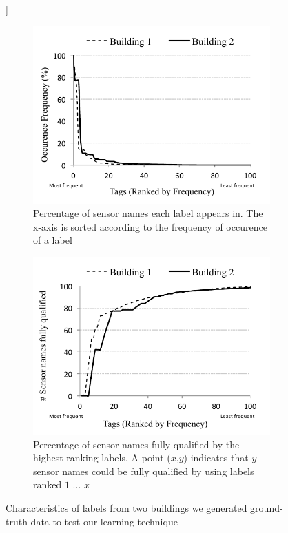 \begin{figure}[h!]]
\centering
	\begin{subfigure}{0.48\textwidth}
                \centering
		\includegraphics[width=\textwidth]{./figs/pointOccuranceFreq.pdf}
                \caption{Percentage of sensor names each label appears in. The x-axis is sorted according to the frequency of occurence of a label}
                \label{fig:labelFreq}
	\end{subfigure}
	\begin{subfigure}{0.48\textwidth}
                \centering
		\includegraphics[width=\textwidth]{./figs/pointCDF.pdf}
                \caption{Percentage of sensor names fully qualified by the highest ranking labels. A point ($x$,$y$) indicates that $y$ sensor names could be fully qualified by using labels ranked $1$ ... $x$}
                \label{fig:pointCDF}
	\end{subfigure}
\caption{Characteristics of labels from two buildings we generated ground-truth data to test our learning technique}
\label{fig:buildingLabelCharacteristics}
\end{figure}



